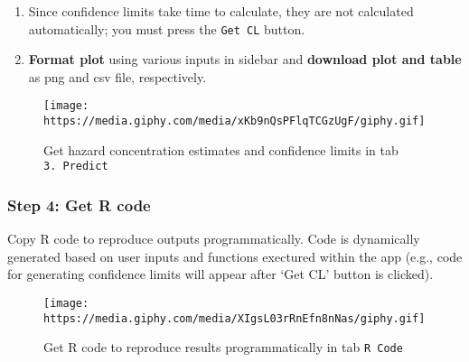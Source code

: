 \documentclass[]{article}
\providecommand{\tightlist}{%
  \setlength{\itemsep}{0pt}\setlength{\parskip}{0pt}}
\begin{document}
\begin{enumerate}
\def\labelenumi{\arabic{enumi}.}
\setcounter{enumi}{2}
\tightlist
\item
  Since confidence limits take time to calculate, they are not
  calculated automatically; you must press the \texttt{Get\ CL} button.
\item
  \textbf{Format plot} using various inputs in sidebar and
  \textbf{download plot and table} as png and csv file, respectively.\\
\end{enumerate}

\begin{figure}
\centering
\texttt{[image: https://media.giphy.com/media/xKb9nQsPFlqTCGzUgF/giphy.gif]}
\caption{Get hazard concentration estimates and confidence limits in tab
\texttt{3.\ Predict}}
\end{figure}

\hypertarget{step-4-get-r-code}{%
\subsubsection{Step 4: Get R code}\label{step-4-get-r-code}}

Copy R code to reproduce outputs programmatically. Code is dynamically
generated based on user inputs and functions exectured within the app
(e.g., code for generating confidence limits will appear after `Get CL'
button is clicked).\\

\begin{figure}
\centering
\texttt{[image: https://media.giphy.com/media/XIgsL03rRnEfn8nNas/giphy.gif]}
\caption{Get R code to reproduce results programmatically in tab
\texttt{R\ Code}}
\end{figure}
\end{document}
